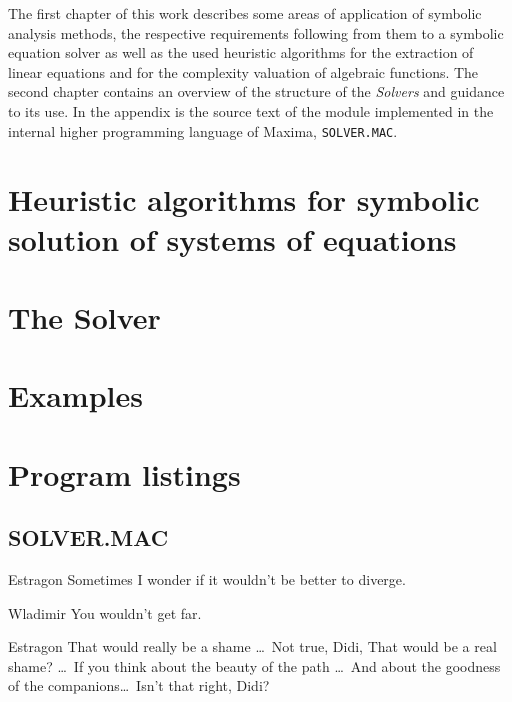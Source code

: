 \documentclass[11pt]{report}           %
\begin{document}
The first chapter of this work describes some areas of application of symbolic analysis methods, the respective
 requirements following from them to a symbolic equation solver as well as the used heuristic algorithms for the extraction of linear equations and for the complexity valuation of algebraic functions. The second chapter contains an overview of the structure of the {\em Solvers} and guidance to its use. In the appendix is the source text of the module implemented in the internal higher programming language of Maxima, \verb+SOLVER.MAC+.


\cleardoublepage
\pagestyle{headings}
\tableofcontents

\cleardoublepage

\chapter[Heuristic algorithms]{Heuristic algorithms for
symbolic solution of systems of equations}


\cleardoublepage
\chapter{The Solver}



\cleardoublepage
{}


\cleardoublepage
\begin{appendix}
{\raggedbottom
{}

\chapter{Examples}


\cleardoublepage
\chapter{Program listings}

\section{SOLVER.MAC}

}
\end{appendix}

\cleardoublepage
{%
\thispagestyle{empty}
\parindent-1cm
\parskip\baselineskip
\vspace*{4cm}
\large
{}

{\sc Estragon} Sometimes I wonder if it wouldn't be better to diverge.

{\sc Wladimir} You wouldn't get far.

{\sc Estragon} 
That would really be a shame \ldots\ Not true, Didi,
That would be a real shame? \ldots\ If you think about the beauty of the path
 \ldots\ And about the goodness of the companions\ldots\ Isn't that right, Didi?

}

\end{document}
